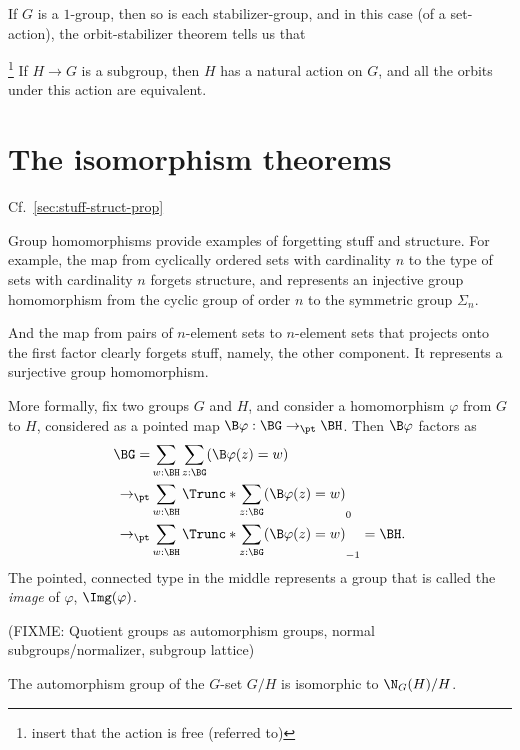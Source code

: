 If $G$ is a $1$-group,
then so is each stabilizer-group,
and in this case (of a set-action),
the orbit-stabilizer theorem
tells us that

\begin{theorem}\footnote{insert that the action is free (referred to)}
\label{thm:lagrange}
  If $H \to G$ is a subgroup, then $H$ has a natural action on $G$,
  and all the orbits under this action are equivalent.
\end{theorem}


\section{The isomorphism theorems}
\label{sec:noether-theorems}

Cf.~\cref{sec:stuff-struct-prop}

Group homomorphisms provide examples of forgetting stuff and structure.
For example, the map from cyclically ordered sets with cardinality $n$
to the type of sets with cardinality $n$ forgets structure,
and represents an injective group homomorphism from the cyclic
group of order $n$ to the symmetric group $\Sigma_n$.

And the map from pairs of $n$-element sets to $n$-element sets
that projects onto the first factor clearly forgets stuff,
namely, the other component.
It represents a surjective group homomorphism.

More formally, fix two groups $G$ and $H$,
and consider a homomorphism $\varphi$ from $G$ to $H$,
considered as a pointed map $\B\varphi : \BG \to_\pt \BH$.
Then $\B\varphi$ factors as
\begin{align*}
  \BG
  = &\sum_{w:\BH}\sum_{z:\BG}(\B\varphi(z)=w)\\
  \to_\pt &\sum_{w:\BH}\Trunc*{\sum_{z:\BG}(\B\varphi(z)=w)}_0\\
  \to_\pt &\sum_{w:\BH}\Trunc*{\sum_{z:\BG}(\B\varphi(z)=w)}_{-1} = \BH.
\end{align*}
The pointed, connected type in the middle represents a group
that is called the \emph{image} of $\varphi$, $\Img(\varphi)$.


(FIXME: Quotient groups as automorphism groups, normal subgroups/normalizer, subgroup lattice)

\begin{lemma}
  \label{lem:aut-orbit}
  The automorphism group of the $G$-set $G/H$ is isomorphic to $\N_G(H)/H$.
\end{lemma}


